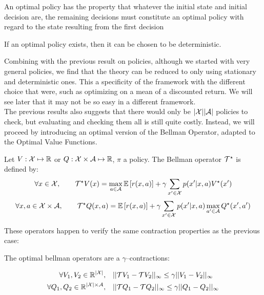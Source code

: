 \begin{proposition}
    An optimal policy has the property that whatever the initial state and initial decision are, the remaining decisions must constitute an optimal policy with regard to the state resulting from the first decision
\end{proposition}

\begin{corollary}
    If an optimal policy exists, then it can be chosen to be deterministic.
\end{corollary}

Combining with the previous result on policies, although we started with very general policies, we find that the theory can be reduced to only using stationary and deterministic ones. This a specificity of the framework with the different choice that were, such as optimizing on a mean of a discounted return. We will see later that it may not be so easy in a different framework.\\

The previous results also suggests that there would only be $|\mathcal{X}||\mathcal{A}|$ policies to check, but evaluating and checking them all is still quite costly. Instead, we will proceed by introducing an optimal version of the Bellman Operator, adapted to the Optimal Value Functions.

\begin{definition}
Let $V: \mathcal{X} \mapsto \mathbb{R}$ or $Q: \mathcal{X} \times \mathcal{A} \mapsto \mathbb{R}$, $\pi$ a policy. The Bellman operator $\mathcal{T}^{\star}$ is defined by:
\[ \forall x \in \mathcal{X}, \qquad \mathcal{T}^{\star} V(x) = \max_{a \in \mathcal{A}} \mathbb{E}\left[ r(x,a) \right] + \gamma \sum_{x^\prime  \in \mathcal{X}} p(x^\prime |x,a)V^{\star}(x^\prime ) \]
\[ \forall x,a \in \mathcal{X} \times \mathcal{A}, \qquad \mathcal{T}^{\star} Q(x,a) = \mathbb{E}\left[ r(x,a) \right] + \gamma \sum_{x^\prime  \in \mathcal{X}} p(x^\prime |x,a)\max_{a^\prime  \in \mathcal{A}}Q^{\star}(x^\prime ,a^\prime ) \]
\end{definition}

These operators happen to verify the same contraction properties as the previous case:

\begin{proposition}
    The optimal bellman operators are a $\gamma$--contractions:

    \begin{align*}
        \forall V_1, V_2 \in \mathbb{R}^{|\mathcal{X}|}, \quad &|| \mathcal{T} V_1 - \mathcal{T} V_2 ||_\infty \leq \gamma ||  V_1 - V_2 ||_\infty\\
        \forall Q_1, Q_2 \in \mathbb{R}^{|\mathcal{X}|\times \mathcal{A}}, \quad &|| \mathcal{T} Q_1 - \mathcal{T} Q_2 ||_\infty \leq \gamma ||  Q_1 - Q_2 ||_\infty
    \end{align*}
\end{proposition}

